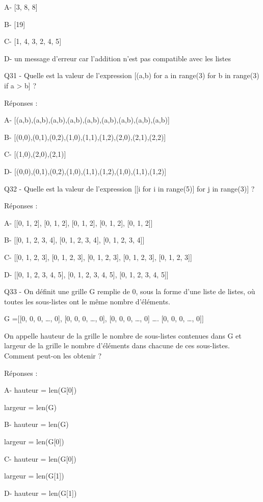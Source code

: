 \documentclass[
]{book}
\begin{document}
A- {[}3, 8, 8{]}

B- {[}19{]}

C- {[}1, 4, 3, 2, 4, 5{]}

D- un message d'erreur car l'addition n'est pas compatible avec les listes

Q31 - Quelle est la valeur de l'expression {[}(a,b) for a in range(3) for b in range(3) if a \textgreater{} b{]} ?

Réponses :

A- {[}(a,b),(a,b),(a,b),(a,b),(a,b),(a,b),(a,b),(a,b),(a,b){]}

B- {[}(0,0),(0,1),(0,2),(1,0),(1,1),(1,2),(2,0),(2,1),(2,2){]}

C- {[}(1,0),(2,0),(2,1){]}

D- {[}(0,0),(0,1),(0,2),(1,0),(1,1),(1,2),(1,0),(1,1),(1,2){]}

Q32 - Quelle est la valeur de l'expression {[}{[}i for i in range(5){]} for j in range(3){]} ?

Réponses :

A- {[}{[}0, 1, 2{]}, {[}0, 1, 2{]}, {[}0, 1, 2{]}, {[}0, 1, 2{]}, {[}0, 1, 2{]}{]}

B- {[}{[}0, 1, 2, 3, 4{]}, {[}0, 1, 2, 3, 4{]}, {[}0, 1, 2, 3, 4{]}{]}

C- {[}{[}0, 1, 2, 3{]}, {[}0, 1, 2, 3{]}, {[}0, 1, 2, 3{]}, {[}0, 1, 2, 3{]}, {[}0, 1, 2, 3{]}{]}

D- {[}{[}0, 1, 2, 3, 4, 5{]}, {[}0, 1, 2, 3, 4, 5{]}, {[}0, 1, 2, 3, 4, 5{]}{]}

Q33 - On définit une grille G remplie de 0, sous la forme d'une liste de listes, où toutes les sous-listes ont le même nombre d'éléments.

G ={[}{[}0, 0, 0, \ldots, 0{]},
{[}0, 0, 0, \ldots, 0{]},
{[}0, 0, 0, \ldots, 0{]}
\ldots.
{[}0, 0, 0, \ldots, 0{]}{]}

On appelle hauteur de la grille le nombre de sous-listes contenues dans G et largeur de la grille le nombre d'éléments dans chacune de ces sous-listes. Comment peut-on les obtenir ?

Réponses :

A- hauteur = len(G{[}0{]})

largeur = len(G)

B- hauteur = len(G)

largeur = len(G{[}0{]})

C- hauteur = len(G{[}0{]})

largeur = len(G{[}1{]})

D- hauteur = len(G{[}1{]})
\end{document}
